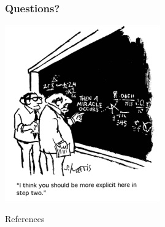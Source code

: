 \documentclass[xcolor=x11names,compress]{beamer}
\renewcommand{\(}{\begin{columns}}
\renewcommand{\)}{\end{columns}}
\newcommand{\<}[1]{\begin{column}{#1}}
\renewcommand{\>}{\end{column}}
\begin{document}
\section*{}
\begin{frame}[fragile]
  \frametitle{Questions?}
  \begin{center}
  \includegraphics[height=3in,clip]{../questions-comic}  
  \end{center}
  
\end{frame}

\begin{frame}{References}
	
	
\end{frame}
\end{document}
